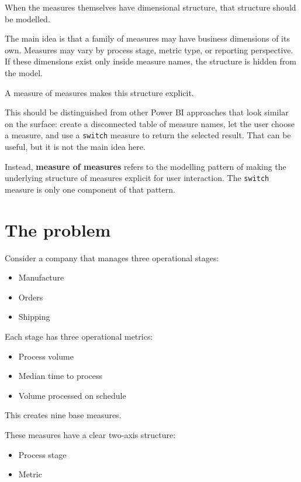 \documentclass[10pt,openany,10pt]{book}
\providecommand{\tightlist}{%
  \setlength{\itemsep}{0pt}\setlength{\parskip}{0pt}}
\begin{document}
When the measures themselves have dimensional structure, that structure
should be modelled.

The main idea is that a family of measures may have business dimensions
of its own. Measures may vary by process stage, metric type, or
reporting perspective. If these dimensions exist only inside measure
names, the structure is hidden from the model.

A measure of measures makes this structure explicit.

This should be distinguished from other Power BI approaches that look
similar on the surface: create a disconnected table of measure names,
let the user choose a measure, and use a \texttt{switch} measure to
return the selected result. That can be useful, but it is not the main
idea here.

Instead, \textbf{measure of measures} refers to the modelling pattern of
making the underlying structure of measures explicit for user
interaction. The \texttt{switch} measure is only one component of that
pattern.

\section{The problem}\label{the-problem}

Consider a company that manages three operational stages:

\begin{itemize}
\tightlist
\item
  Manufacture
\item
  Orders
\item
  Shipping
\end{itemize}

Each stage has three operational metrics:

\begin{itemize}
\tightlist
\item
  Process volume
\item
  Median time to process
\item
  Volume processed on schedule
\end{itemize}

This creates nine base measures.

These measures have a clear two-axis structure:

\begin{itemize}
\tightlist
\item
  Process stage
\item
  Metric
\end{itemize}
\end{document}
